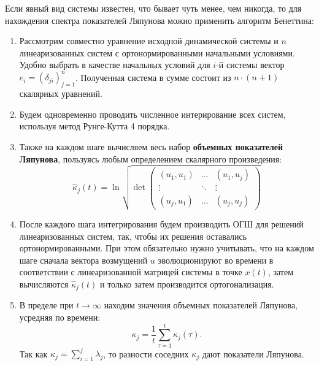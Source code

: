 Если явный вид системы известен, что бывает чуть менее, чем никогда, то для нахождения спектра показателей Ляпунова можно применить алгоритм Бенеттина:
\begin{enumerate}
\item
    Рассмотрим совместно уравнение исходной динамической системы и $n$ линеаризованных систем с ортонормированными начальными условиями.
    Удобно выбрать в качестве начальных условий для $i$-й системы вектор $e_i = \left( \delta_{ji} \right)_{j=1}^{n}$.
    Полученная система в сумме состоит из $n\cdot\left( n+1 \right)$ скалярных уравнений.
\item
    Будем одновременно проводить численное интерирование всех систем, используя метод Рунге-Кутта 4 порядка.
\item
    Также на каждом шаге вычисляем весь набор \textbf{объемных показателей Ляпунова}, пользуясь любым определением скалярного произведения:
    \begin{equation*}
        \hat{\kappa}_j(t) = \ln \sqrt{\det \begin{pmatrix}
            \left( u_1, u_1 \right) & \dots & \left( u_1, u_j \right)\\
            \vdots & \ddots & \vdots\\
            \left( u_j, u_1 \right) & \dots & \left( u_j, u_j \right)
        \end{pmatrix} }
    \end{equation*}
\item
    После каждого шага интегрирования будем производить ОГШ для решений линеаризованных систем, так, чтобы их решения оставались ортонормированными.
    При этом обязательно нужно учитывать, что на каждом шаге сначала вектора возмущений $u$ эволюционируют во времени в соответствии с линеаризованной матрицей системы в точке $x(t)$, затем вычисляются $\hat{\kappa}_j(t)$ и только затем производится ортогонализация.
\item
    В пределе при $t \to \infty$ находим значения объемных показателей Ляпунова, усредняя по времени:
    \begin{equation*}
        \kappa_j = \frac{1}{t} \sum_{\tau=1}^{t} \hat{\kappa}_j(\tau).
    \end{equation*}
    Так как $\kappa_j = \sum_{i=1}^{j} \lambda_j$, то разности соседних $\kappa_j$ дают показатели Ляпунова.
\end{enumerate}

